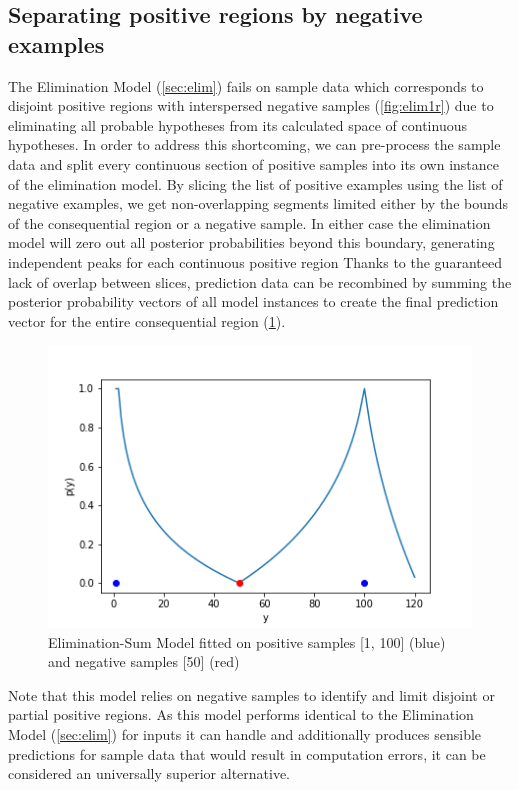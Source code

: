 \documentclass[12pt, ]{scrartcl}
\begin{document}
\begin{multicols}{2}
\section{Separating positive regions by negative examples}\label{sec:elimsum}
The Elimination Model (\cref{sec:elim}) fails on sample data which corresponds to disjoint positive regions with interspersed negative samples (\cref{fig:elim1r}) due to eliminating all probable hypotheses from its calculated space of continuous hypotheses.
In order to address this shortcoming, we can pre-process the sample data and split every continuous section of positive samples into its own instance of the elimination model.
By slicing the list of positive examples using the list of negative examples, we get non-overlapping segments limited either by the bounds of the consequential region or a negative sample.
In either case the elimination model will zero out all posterior probabilities beyond this boundary, generating independent peaks for each continuous positive region
Thanks to the guaranteed lack of overlap between slices, prediction data can be recombined by summing the posterior probability vectors of all model instances to create the final prediction vector for the entire consequential region (\cref{fig:elim_sum}). 
\begin{figure}[H]
	\centering
	\includegraphics[scale=0.5]{graphics/elimination_sum_model.png}
	\caption{Elimination-Sum Model fitted on positive samples [1, 100] (blue) and negative samples [50] (red)}
	\label{fig:elim_sum}
\end{figure}
Note that this model relies on negative samples to identify and limit disjoint or partial positive regions. As this model performs identical to the Elimination Model (\cref{sec:elim}) for inputs it can handle and additionally produces sensible predictions for sample data that would result in computation errors, it can be considered an universally superior alternative.


\end{multicols}
\end{document}
